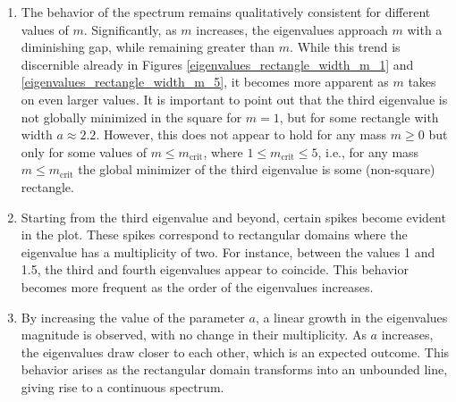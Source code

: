 \begin{enumerate}
  \item \label{dirac_sim_quad_point_1} The behavior of the spectrum remains qualitatively consistent for different values of \(m\). Significantly, as \(m\) increases, the eigenvalues approach \(m\) with a diminishing gap, while remaining greater than \(m\). While this trend is discernible already in Figures \ref{eigenvalues_rectangle_width_m_1} and \ref{eigenvalues_rectangle_width_m_5}, it becomes more apparent as \(m\) takes on even larger values. It is important to point out that the third eigenvalue is not globally minimized in the square for \(m=1\), but for some rectangle with width \(a \approx 2.2\). However, this does not appear to hold for any mass \(m \geq 0\) but only for some values of \(m \leq m_{\text{crit}}\), where \(1 \leq m_{\text{crit}} \leq 5\), i.e., for any mass \(m \leq m_{\text{crit}}\) the global minimizer of the third eigenvalue is some (non-square) rectangle.

  \item \label{dirac_sim_quad_point_2}  Starting from the third eigenvalue and beyond, certain spikes become evident in the plot. These spikes correspond to rectangular domains where the eigenvalue has a multiplicity of two. For instance, between the values 1 and 1.5, the third and fourth eigenvalues appear to coincide. This behavior becomes more frequent as the order of the eigenvalues increases.

  \item \label{dirac_sim_quad_point_3} By increasing the value of the parameter \(a\), a linear growth in the eigenvalues magnitude is observed, with no change in their multiplicity. As \(a\) increases, the eigenvalues draw closer to each other, which is an expected outcome. This behavior arises as the rectangular domain transforms into an unbounded line, giving rise to a continuous spectrum.
\end{enumerate}

